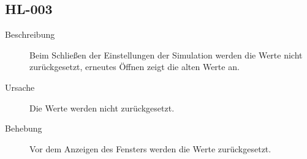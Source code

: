 \documentclass[parskip=full]{scrartcl}
\begin{document}
\subsection{HL-003}
\begin{description}
	\item[Beschreibung] Beim Schließen der Einstellungen der Simulation werden die Werte nicht zurückgesetzt, erneutes Öffnen zeigt die alten Werte an.
	\item[Ursache] Die Werte werden nicht zurückgesetzt.
	\item[Behebung] Vor dem Anzeigen des Fensters werden die Werte zurückgesetzt.
\end{description}

\pagebreak
{}
{}
\listoffigures
\end{document}
